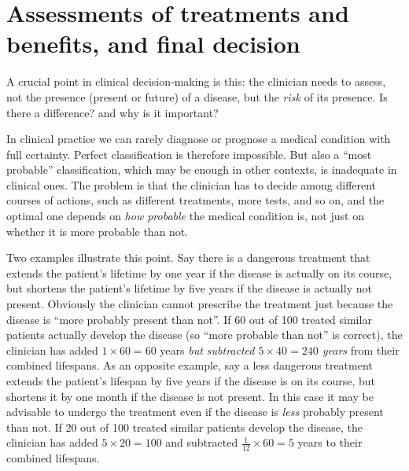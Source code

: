\documentclass[utf8]{FrontiersinHarvard} %
\renewcommand*{\|}[1][]{\nonscript\:#1\vert\nonscript\:\mathopen{}}
\begin{document}



\section{Assessments of treatments and benefits, and final decision}
\label{sec:utilities_step}

A crucial point in clinical decision-making is this: the clinician needs to assess, not the presence (present or future) of a disease, but the \emph{risk} of its presence. Is there a difference? and why is it important?

In clinical practice we can rarely diagnose or prognose a medical condition with full certainty. Perfect classification is therefore impossible. But also a \enquote{most probable} classification, which may be enough in other contexts, is inadequate in clinical ones. The problem is that the clinician has to decide among different courses of actions, such as different treatments, more tests, and so on, and the optimal one depends on \emph{how probable} the medical condition is, not just on whether it is more probable than not.

Two examples illustrate this point. Say there is a dangerous treatment that extends the patient's lifetime by one year if the disease is actually on its course, but shortens the patient's lifetime by five years if the disease is actually not present. Obviously the clinician cannot prescribe the treatment just because the disease is \enquote{more probably present than not}. If 60 out of 100 treated similar patients actually develop the disease (so \enquote{more probable than not} is correct), the clinician has added $1 \times 60 = 60$ years \emph{but subtracted $\mathit{5 \times 40 = 240}$ years} from their combined lifespans. As an opposite example, say a less dangerous treatment extends the patient's lifespan by five years if the disease is on its course, but shortens it by one month if the disease is not present. In this case it may be advisable to undergo the treatment even if the disease is \emph{less} probably present than not. If 20 out of 100 treated similar patients develop the disease, the clinician has added $5 \times 20=100$ and subtracted $\tfrac{1}{12} \times 60=5$ years to their combined lifespans.
\end{document}
